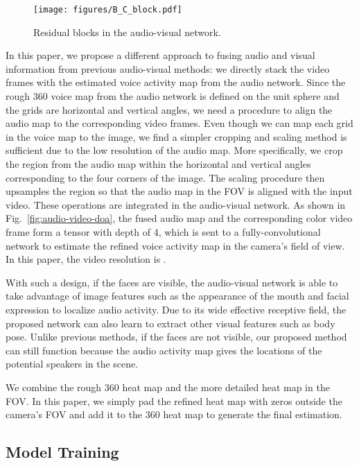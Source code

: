 \documentclass[10pt,twocolumn,letterpaper]{article}
\begin{document}
\begin{figure}[tb]
\centering
\texttt{[image: figures/B\_C\_block.pdf]}
\vspace{-20pt}
\caption{Residual blocks in the audio-visual network.}
\vspace{-20pt}
\label{fig:blocks}	
\end{figure}

In this paper, we propose a different approach to fusing audio and visual information
from previous audio-visual methods: we directly stack the
video frames with the estimated voice activity map from the audio network. Since the rough 360 voice map from the audio network 
is defined on the unit sphere and the grids are horizontal and vertical angles, we need a procedure to align the 
audio map to the corresponding video frames. Even though we can map each grid in the voice map to the image, 
we find a simpler cropping and scaling method is sufficient due to the low resolution of the 
audio map. 
More specifically, we crop the region from the audio map within the 
horizontal and vertical angles corresponding to the four corners of the image. 
The scaling procedure then upsamples the region so that the audio map in the FOV is aligned with the 
input video. These operations are integrated in the audio-visual network.
As shown in Fig.~\ref{fig:audio-video-doa}, the fused audio map and the corresponding color video frame form a tensor with depth of 4,
which is sent to a fully-convolutional network to estimate the refined voice activity map in the camera's field of view.
In this paper, the video resolution is . 

With such a design, 
if the faces are visible, the audio-visual network is able to take advantage of image features such as the appearance 
of the mouth and facial expression to localize audio activity. Due to its wide effective receptive field, 
the proposed network can also learn to extract other visual features such as body pose. 
Unlike previous methods, if the faces are not visible, our proposed method can still function because
the audio activity map gives the locations of the potential speakers in the scene.


We combine the rough 360 heat map and the more detailed heat map in the FOV. In this paper, we simply pad 
the refined heat map with zeros outside the camera's FOV and add it to the 360 heat map to generate the final estimation.

\subsection{Model Training} \label{sec:training}
\end{document}
